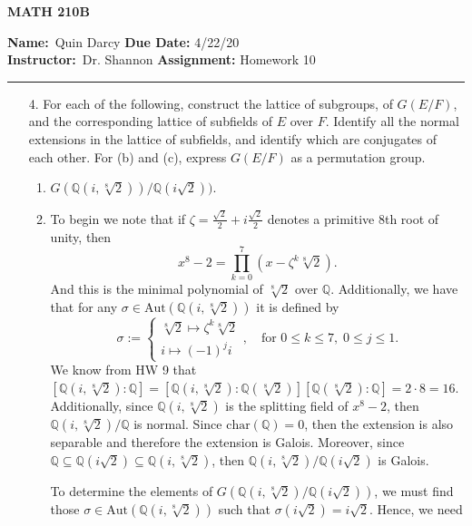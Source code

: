 \documentclass[12pt]{article}
\makeatletter
\theoremstyle{definition}
\theoremstyle{remark}
\newenvironment{solution}[1][\bf{\textit{Solution}}]{\par
  
  \normalfont \topsep6\p@\@plus6\p@\relax
  \list{}{\leftmargin=0mm
          \rightmargin=4mm
          \settowidth{\itemindent}{\itshape#1}%
          \labelwidth=\itemindent
          \parsep=0pt \listparindent=\parindent 
  }
  \item[\hskip\labelsep
        \itshape
    #1\@addpunct{.}]\ignorespaces
}{%
  \popQED\endlist\@endpefalse
}
\makeatother
\begin{document}
\thispagestyle{empty}\hline

\begin{center}
	\vspace{.4cm} {\textbf { \large MATH 210B}}
\end{center}
{\textbf{Name:}\ Quin Darcy \hspace{\fill} \textbf{Due Date:} 4/22/20   \\
{ \textbf{Instructor:}}\ Dr. Shannon \hspace{\fill} \textbf{Assignment:} Homework 10 \\ \hrule}

\justifying

    \begin{enumerate}[leftmargin=*]
        \item[4.] For each of the following, construct the lattice of subgroups, of $G(E/F)$, and the corresponding lattice of subfields of $E$ over $F$. Identify all the normal extensions in the lattice of subfields, and identify which are conjugates of each other. For (b) and (c), express $G(E/F)$ as a permutation group.
            \begin{enumerate}
                \item $G(\mathbb{Q}(i,\sqrt[8]{2}))/\mathbb{Q}(i\sqrt{2}))$.
                    \begin{solution}
                        To begin we note that if $\zeta=\frac{\sqrt{2}}{2}+i\frac{\sqrt{2}}{2}$ denotes a primitive 8th root of unity, then 
                            \begin{equation*}
                                x^8-2=\prod_{k=0}^7(x-\zeta^k\sqrt[8]{2}).
                            \end{equation*}
                        And this is the minimal polynomial of $\sqrt[8]{2}$ over $\mathbb{Q}$. Additionally, we have that for any $\sigma\in\text{Aut}(\mathbb{Q}(i,\sqrt[8]{2}))$ it is defined by
                            \begin{equation*}
                                \sigma:=\begin{cases} \sqrt[8]{2}\mapsto\zeta^k\sqrt[8]{2} \\ i\mapsto (-1)^ji\end{cases},\quad\text{for }0\leq k\leq 7,\;0\leq j\leq 1.
                            \end{equation*}
                        We know from HW 9 that $[\mathbb{Q}(i,\sqrt[8]{2})\colon\mathbb{Q}]=[\mathbb{Q}(i,\sqrt[8]{2})\colon\mathbb{Q}(\sqrt[8]{2})][\mathbb{Q}(\sqrt[8]{2})\colon\mathbb{Q}]=2\cdot 8=16$. Additionally, since $\mathbb{Q}(i,\sqrt[8]{2})$ is the splitting field of $x^8-2$, then $\mathbb{Q}(i,\sqrt[8]{2})/\mathbb{Q}$ is normal. Since $\text{char}(\mathbb{Q})=0$, then the extension is also separable and therefore the extension is Galois. Moreover, since $\mathbb{Q}\subseteq\mathbb{Q}(i\sqrt{2})\subseteq\mathbb{Q}(i,\sqrt[8]{2})$, then $\mathbb{Q}(i,\sqrt[8]{2})/\mathbb{Q}(i\sqrt{2})$ is Galois.\par\hspace{4mm} To determine the elements of $G(\mathbb{Q}(i,\sqrt[8]{2})/\mathbb{Q}(i\sqrt{2}))$, we must find those $\sigma\in\text{Aut}(\mathbb{Q}(i,\sqrt[8]{2}))$ such that $\sigma(i\sqrt{2})=i\sqrt{2}$. Hence, we need

\end{solution}
\end{enumerate}
\end{enumerate}
\end{document}
